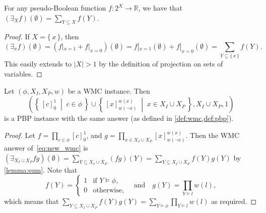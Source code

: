 \begin{lemma} \label{lemma:sum}
  For any pseudo-Boolean function $f\colon 2^X \to \mathbb{R}$, we have that
  $(\exists_X f)(\emptyset) = \sum_{Y \subseteq X} f(Y)$.
\end{lemma}
\begin{proof}
  If $X = \{\, x \,\}$, then
  \[
    (\exists_{x}f)(\emptyset) = (f|_{x=1} + f|_{x=0})(\emptyset) = f|_{x=1}(\emptyset) + f|_{x=0}(\emptyset) = \sum_{Y \subseteq \{\, x \,\}} f(Y).
  \]
  This easily extends to $|X| > 1$ by the definition of projection on sets of
  variables.
\end{proof}

\begin{proposition}\label{prop:equivalence}
  Let $(\phi, X_I, X_P, w)$ be a WMC instance. Then
  \begin{equation}
  \left( \left\{\, {[c]}_0^1 \;\middle|\; c \in \phi \,\right\} \cup \left\{\, {[x]}_{w(\neg x)}^{w(x)} \;\middle|\; x \in X_I \cup X_P \,\right\}, X_I \cup X_P, 1 \right) \label{eq:new_wmc}
  \end{equation}
  is a PBP instance with the same answer (as defined in \cref{def:wmc,def:pbp}).
\end{proposition}
\begin{proof}
  Let $f = \prod_{c \in \phi} {[c]}_0^1$, and
  $g = \prod_{x \in X_I \cup X_P} {[x]}_{w(\neg x)}^{w(x)}$. Then the WMC answer
  of~\eqref{eq:new_wmc} is
  $(\exists_{X_I \cup X_P} fg)(\emptyset) = \sum_{Y \subseteq X_I \cup X_P} (fg)(Y) = \sum_{Y \subseteq X_I \cup X_P} f(Y)g(Y)$
  by \cref{lemma:sum}. Note that
  \[
    f(Y) =
    \begin{cases}
      1 & \text{if } Y \models \phi, \\
      0 & \text{otherwise},
    \end{cases}
    \quad
    \text{and}
    \quad
    g(Y) = \prod_{Y \models l} w(l),
  \]
  which means that
  $\sum_{Y \subseteq X_I \cup X_P} f(Y)g(Y) = \sum_{Y \models \phi} \prod_{Y \models l} w(l)$
  as required.
\end{proof}

